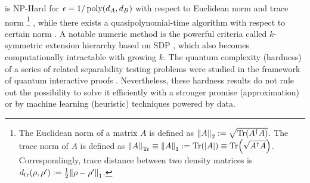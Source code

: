 \documentclass[
aps,
pra,
twocolumn,
floatfix,
]{revtex4-2}
\theoremstyle{plain}
\newtheorem{theorem}{Theorem}
\theoremstyle{definition}
\newcommand{\dm}{\rho}
\newcommand{\locc}{\textup{LOCC}}
\begin{document}
 is NP-Hard for $\epsilon=1/\operatorname{\textup{poly}}(d_A,d_B)$ with respect to Euclidean norm and trace norm \footnote{
	The Euclidean norm of a matrix $A$ is defined as $\norm{A}_2:=\sqrt{\Tr(A^\dagger A)}$.
	The trace norm of $A$ is defined as $\norm{A}_{\Tr}\equiv\norm{A}_{1}:=\Tr(\abs{A})\equiv\Tr(\sqrt{A^\dagger A})$.
	Correspondingly, trace distance between two density matrices is $d_{\tr}(\dm,\dm') : = \frac{1}{2} \norm{\dm-\dm'}_1$.
} \cite{gurvitsClassicalDeterministicComplexity2003} \cite{gharibianStrongNPHardnessQuantum2009},
while there exists a quasipolynomial-time algorithm with respect to certain norm \cite{brandaoQuasipolynomialtimeAlgorithmQuantum2011}.
A notable numeric method is the powerful criteria called $k$-symmetric extension hierarchy based on SDP \cite{dohertyCompleteFamilySeparability2004} \cite{ioannouComputationalComplexityQuantum2007} \cite{navascuesPowerSymmetricExtensions2009}, 
which also becomes computationally intractable with growing $k$.
The quantum complexity (hardness) of a series of related separability testing problems were studied in the framework of quantum interactive proofs \cite{gutoskiQuantumInteractiveProofs2015}.
Nevertheless, these hardness results do not rule out the possibility to solve it efficiently with a stronger promise (approximation) or by machine learning (heuristic) techniques powered by data.
\end{document}
